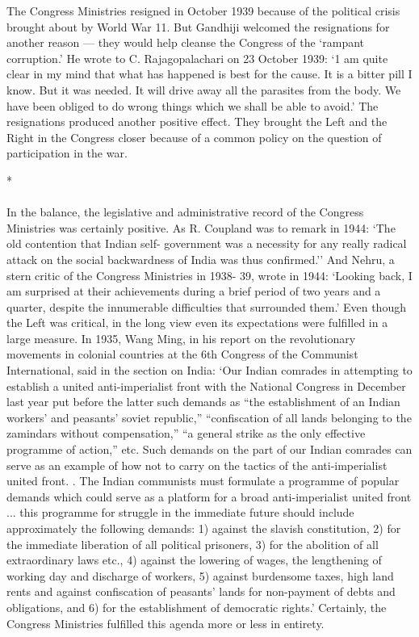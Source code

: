 The Congress Ministries resigned in October 1939 because of the political crisis brought about by World War 11. But Gandhiji welcomed the resignations for another reason --- they would help cleanse the Congress of the `rampant corruption.' He wrote to C. Rajagopalachari on 23 October 1939: `1 am quite clear in my mind that what has happened is best for the cause. It is a bitter pill I know. But it was needed. It will drive away all the parasites from the body. We have been obliged to do wrong things which we shall be able to avoid.' The resignations produced another positive effect. They brought the Left and the Right in the Congress closer because of a common policy on the question of participation in the war.

\begin{center}*\end{center}

\paragraph*{}

In the balance, the legislative and administrative record of the Congress Ministries was certainly positive. As R. Coupland was to remark in 1944: `The old contention that Indian self- government was a necessity for any really radical attack on the social backwardness of India was thus confirmed.'' And Nehru, a stern critic of the Congress Ministries in 1938- 39, wrote in 1944: `Looking back, I am surprised at their achievements during a brief period of two years and a quarter, despite the innumerable difficulties that surrounded them.' Even though the Left was critical, in the long view even its expectations were fulfilled in a large measure. In 1935, Wang Ming, in his report on the revolutionary movements in colonial countries at the 6th Congress of the Communist International, said in the section on India: `Our Indian comrades in attempting to establish a united anti-imperialist front with the National Congress in December last year put before the latter such demands as ``the establishment of an Indian workers' and peasants' soviet republic,'' ``confiscation of all lands belonging to the zamindars without compensation,'' ``a general strike as the only effective programme of action,'' etc. Such demands on the part of our Indian comrades can serve as an example of how not to carry on the tactics of the anti-imperialist united front. . The Indian communists must formulate a programme of popular demands which could serve as a platform for a broad anti-imperialist united front ... this programme for struggle in the immediate future should include approximately the following demands: 1) against the slavish constitution, 2) for the immediate liberation of all political prisoners, 3) for the abolition of all extraordinary laws etc., 4) against the lowering of wages, the lengthening of working day and discharge of workers, 5) against burdensome taxes, high land rents and against confiscation of peasants' lands for non-payment of debts and obligations, and 6) for the establishment of democratic rights.' Certainly, the Congress Ministries fulfilled this agenda more or less in entirety. 

